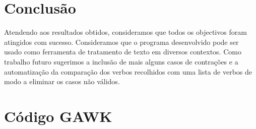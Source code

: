 \documentclass{report}
\begin{document}
\chapter{Conclusão} \label{concl}
Atendendo aos resultados obtidos, consideramos que todos os objectivos foram atingidos com sucesso.
Consideramos que o programa desenvolvido pode ser usado como ferramenta de tratamento de texto em diversos contextos.
Como trabalho futuro sugerimos a inclusão de mais alguns casos de contrações e a automatização da comparação dos verbos recolhidos com uma lista de verbos de modo a eliminar os casos não válidos.

\appendix
\chapter{Código GAWK}
\end{document}
